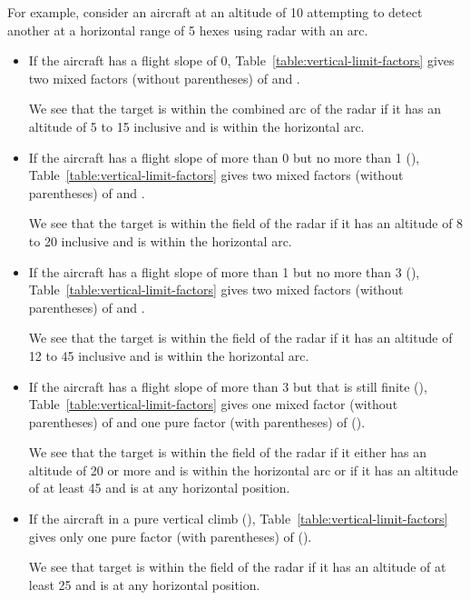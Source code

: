 For example, consider an aircraft at an altitude of 10 attempting to detect another at a horizontal range of 5 hexes using radar with an  arc.
\begin{itemize}
\item
If the aircraft has a flight slope of 0, Table~\ref{table:vertical-limit-factors} gives two mixed factors (without parentheses) of  and . 

We see that the target is within the combined arc of the radar if it has an altitude of 5 to 15 inclusive and is within the  horizontal arc.

\item
If the aircraft has a flight slope of more than 0 but no more than 1 (), Table~\ref{table:vertical-limit-factors} gives two mixed factors (without parentheses) of  and . 

We see that the target is within the field of the radar if it has an altitude of 8 to 20 inclusive and is within the  horizontal arc.

\item
If the aircraft has a flight slope of more than 1 but no more than 3 (), Table~\ref{table:vertical-limit-factors} gives two mixed factors (without parentheses) of  and . 

We see that the target is within the field of the radar if it has an altitude of 12 to 45 inclusive and is within the  horizontal arc.

\item
If the aircraft has a flight slope of more than 3 but that is still finite (), Table~\ref{table:vertical-limit-factors} gives one mixed factor (without parentheses) of  and one pure factor (with parentheses) of ().

We see that the target is within the field of the radar if it either has an altitude of 20 or more and is within the  horizontal arc or if it has an altitude of at least 45 and is at any horizontal position.

\item
If the aircraft in a pure vertical climb (), Table~\ref{table:vertical-limit-factors} gives only one pure factor (with parentheses) of ().

We see that target is within the field of the radar if it has an altitude of at least 25 and is at any horizontal position.

\end{itemize}




